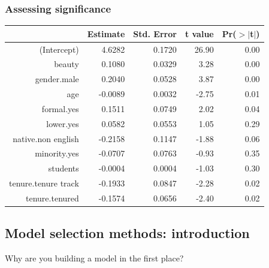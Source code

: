 \begin{frame}
\frametitle{Assessing significance}


{\scriptsize
\begin{center}
\begin{tabular}{rrrrr}
  \hline
 & Estimate & Std. Error & t value & Pr($>$$|$t$|$) \\ 
  \hline
(Intercept) & 4.6282 & 0.1720 & 26.90 & 0.00 \\ 
  beauty & 0.1080 & 0.0329 & 3.28 & 0.00 \\ 
  gender.male & 0.2040 & 0.0528 & 3.87 & 0.00 \\ 
  age & -0.0089 & 0.0032 & -2.75 & 0.01 \\ 
  formal.yes & 0.1511 & 0.0749 & 2.02 & 0.04 \\ 
  \rowcolor{oiB!50}
  lower.yes & 0.0582 & 0.0553 & 1.05 & 0.29 \\ 
    \rowcolor{oiB!50}
  native.non english & -0.2158 & 0.1147 & -1.88 & 0.06 \\ 
    \rowcolor{oiB!50}
  minority.yes & -0.0707 & 0.0763 & -0.93 & 0.35 \\ 
    \rowcolor{oiB!50}
  students & -0.0004 & 0.0004 & -1.03 & 0.30 \\ 
  tenure.tenure track & -0.1933 & 0.0847 & -2.28 & 0.02 \\ 
  tenure.tenured & -0.1574 & 0.0656 & -2.40 & 0.02 \\ 
   \hline
\end{tabular}
\end{center}
}

\end{frame}


\subsection{Model selection methods: introduction}




\begin{frame}{Why are you building a model in the first place?}


\end{frame}


